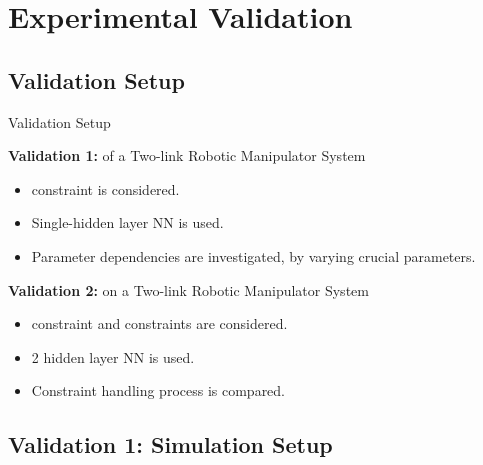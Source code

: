 \documentclass[8pt, aspectratio=169]{beamer}
\newcommand{\ctxt}[2]{\color{#1}{#2}\color{black}}
\begin{document}

\section{Experimental Validation}

\subsection{Validation Setup}

\begin{frame}{Validation Setup}

  \textbf{Validation 1:} \ctxt{awesome}{Simulation } of a Two-link Robotic Manipulator System

  \begin{itemize}
    \item \ctxt{awesome}{Weight norm } constraint is considered.
    \item Single-hidden layer NN is used.
    \item Parameter dependencies are investigated, by varying crucial parameters.
  \end{itemize}

  \textbf{Validation 2:} \ctxt{airforceblue}{Real-time Implementation } on a Two-link Robotic Manipulator System

  \begin{itemize}
    \item \ctxt{awesome}{Weight norm } constraint and \ctxt{airforceblue}{input saturation } constraints are considered.
    \item 2 hidden layer NN is used.
    \item Constraint handling process is compared.
  \end{itemize}

\end{frame}


\subsection{Validation 1: Simulation Setup}
\end{document}
